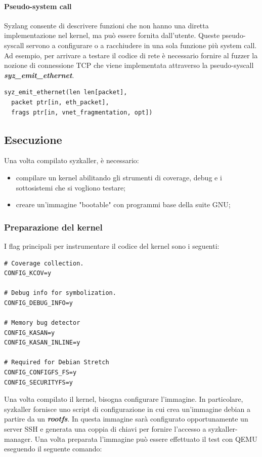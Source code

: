 \documentclass{article}
\begin{document}
\paragraph{Pseudo-system call} Syzlang consente di descrivere funzioni che non hanno una 
diretta implementazione nel kernel, ma può essere fornita dall'utente. Queste pseudo-syscall 
servono a configurare o a racchiudere in una sola funzione più system call. Ad esempio, 
per arrivare a testare il codice di rete è necessario fornire al fuzzer la nozione di 
connessione TCP che viene implementata attraverso la pseudo-syscall 
\textbf{\textit{syz\_emit\_ethernet}}.

\begin{verbatim}
syz_emit_ethernet(len len[packet], 
  packet ptr[in, eth_packet], 
  frags ptr[in, vnet_fragmentation, opt])
\end{verbatim}

\subsection{Esecuzione}
Una volta compilato syzkaller, è necessario:
\begin{itemize}
  \item compilare un kernel abilitando gli strumenti di coverage, debug e i sottosistemi
    che si vogliono testare;
  \item creare un'immagine "bootable" con programmi base della suite GNU;
\end{itemize}

\subsubsection{Preparazione del kernel}
I flag principali per instrumentare il codice del kernel sono i seguenti:
\begin{verbatim}
# Coverage collection.
CONFIG_KCOV=y

# Debug info for symbolization.
CONFIG_DEBUG_INFO=y

# Memory bug detector
CONFIG_KASAN=y
CONFIG_KASAN_INLINE=y

# Required for Debian Stretch
CONFIG_CONFIGFS_FS=y
CONFIG_SECURITYFS=y
\end{verbatim}
Una volta compilato il kernel, bisogna configurare l'immagine. In particolare, syzkaller 
fornisce uno script di configurazione in cui crea un'immagine debian a partire da un 
\textbf{\textit{rootfs}}.
In questa immagine sarà configurato opportunamente un server SSH 
e generata una coppia di chiavi per fornire l'accesso a syzkaller-manager. Una volta 
preparata l'immagine può essere effettuato il test con QEMU eseguendo il seguente comando: 
\end{document}
